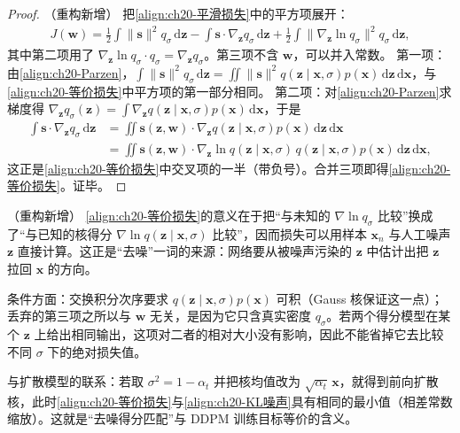 \documentclass[../../main.tex]{subfiles}
\begin{document}
\begin{proof}（重构新增）
把\eqref{align:ch20-平滑损失}中的平方项展开：
\begin{align*}
J(\bm{w})=\frac{1}{2}\int\|\bm{s}\|^2q_{\sigma}\,\mathrm{d}\bm{z}-\int\bm{s}\cdot\nabla_{\bm{z}}q_{\sigma}\,\mathrm{d}\bm{z}+\frac{1}{2}\int\|\nabla_{\bm{z}}\ln q_{\sigma}\|^2q_{\sigma}\,\mathrm{d}\bm{z},
\end{align*}
其中第二项用了 $\nabla_{\bm{z}}\ln q_{\sigma}\cdot q_{\sigma}=\nabla_{\bm{z}}q_{\sigma}$。第三项不含 $\bm{w}$，可以并入常数。
第一项：由\eqref{align:ch20-Parzen}，$\int\|\bm{s}\|^2q_{\sigma}\,\mathrm{d}\bm{z}=\iint\|\bm{s}\|^2q(\bm{z}\mid\bm{x},\sigma)p(\bm{x})\,\mathrm{d}\bm{z}\,\mathrm{d}\bm{x}$，与\eqref{align:ch20-等价损失}中平方项的第一部分相同。
第二项：对\eqref{align:ch20-Parzen}求梯度得 $\nabla_{\bm{z}}q_{\sigma}(\bm{z})=\int\nabla_{\bm{z}}q(\bm{z}\mid\bm{x},\sigma)p(\bm{x})\,\mathrm{d}\bm{x}$，于是
\begin{align*}
\int\bm{s}\cdot\nabla_{\bm{z}}q_{\sigma}\,\mathrm{d}\bm{z}&=\iint\bm{s}(\bm{z},\bm{w})\cdot\nabla_{\bm{z}}q(\bm{z}\mid\bm{x},\sigma)p(\bm{x})\,\mathrm{d}\bm{z}\,\mathrm{d}\bm{x}\\
&=\iint\bm{s}(\bm{z},\bm{w})\cdot\nabla_{\bm{z}}\ln q(\bm{z}\mid\bm{x},\sigma)\,q(\bm{z}\mid\bm{x},\sigma)p(\bm{x})\,\mathrm{d}\bm{z}\,\mathrm{d}\bm{x},
\end{align*}
这正是\eqref{align:ch20-等价损失}中交叉项的一半（带负号）。合并三项即得\eqref{align:ch20-等价损失}。证毕。
\end{proof}

\begin{remark}（重构新增）
\eqref{align:ch20-等价损失}的意义在于把“与未知的 $\nabla\ln q_{\sigma}$ 比较”换成了“与已知的核得分 $\nabla\ln q(\bm{z}\mid\bm{x},\sigma)$ 比较”，因而损失可以用样本 $\bm{x}_n$ 与人工噪声 $\bm{z}$ 直接计算。这正是“去噪”一词的来源：网络要从被噪声污染的 $\bm{z}$ 中估计出把 $\bm{z}$ 拉回 $\bm{x}$ 的方向。\par
条件方面：交换积分次序要求 $q(\bm{z}\mid\bm{x},\sigma)p(\bm{x})$ 可积（Gauss 核保证这一点）；丢弃的第三项之所以与 $\bm{w}$ 无关，是因为它只含真实密度 $q_{\sigma}$。若两个得分模型在某个 $\bm{z}$ 上给出相同输出，这项对二者的相对大小没有影响，因此不能省掉它去比较不同 $\sigma$ 下的绝对损失值。\par
与扩散模型的联系：若取 $\sigma^2=1-\alpha_t$ 并把核均值改为 $\sqrt{\alpha_t}\,\bm{x}$，就得到前向扩散核，此时\eqref{align:ch20-等价损失}与\eqref{align:ch20-KL噪声}具有相同的最小值（相差常数缩放）。这就是“去噪得分匹配”与 DDPM 训练目标等价的含义。
\end{remark}
\end{document}
